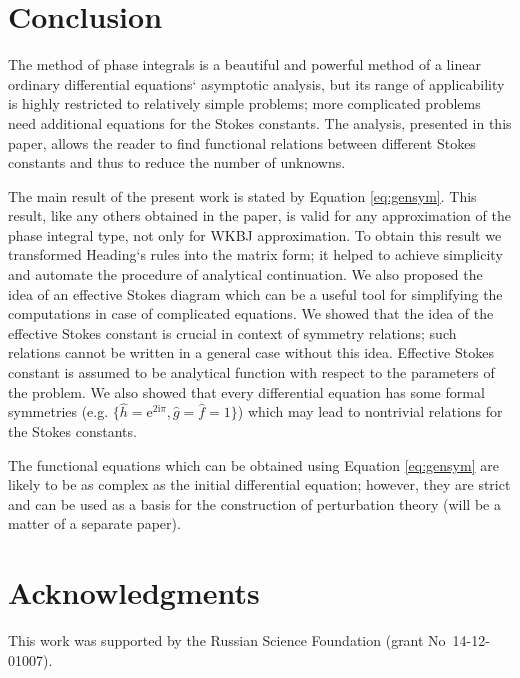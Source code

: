\documentclass[atmp]{ipart_v1}
\def\rme{\mathrm{e}}
\def\rmi{\mathrm{i}}
\def\f{\hat{f}}
\def\g{\hat{g}}
\def\h{\hat{h}}
\def\unity{1}
\newcommand\Eref[1]{Equation \ref{#1}}
\begin{document}
\section{Conclusion \label{sec:cnclsns}}

The method of phase integrals is a beautiful and powerful method of a linear ordinary 
differential equations` asymptotic analysis, but its range of applicability is highly 
restricted to relatively simple problems; more complicated problems need additional equations 
for the Stokes constants. The analysis, presented in this paper, allows the reader to find 
functional relations between different Stokes constants and thus to reduce the number of unknowns.

The main result of the present work is stated by \Eref{eq:gensym}. This result, 
like any others obtained in the paper, is valid for any approximation of the 
phase integral type, not only for WKBJ approximation. To obtain this result 
we transformed Heading`s rules \cite{heading,rwbook} into the matrix form; 
it helped to achieve simplicity and automate the procedure of analytical continuation. 
We also proposed the idea of an effective Stokes diagram which can be a useful tool 
for simplifying the computations in case of complicated equations. 
We showed that the idea of the effective Stokes constant is crucial in context of symmetry relations;
such relations cannot be written in a general case without this idea. 
Effective Stokes constant is assumed to be analytical function with respect to 
the parameters of the problem. 
We also showed that every differential 
equation has some formal symmetries (e.g. $\{\h=\rme^{2\rmi\pi},\g=\f=\unity\}$) which may lead
to nontrivial relations for the Stokes constants. 

The functional equations which can be obtained using \Eref{eq:gensym} are likely to be as 
complex as the initial differential equation; however, they are strict and can be used as 
a basis for the construction of perturbation theory (will be a matter of a separate paper).

\section*{Acknowledgments}
This work was supported by the Russian Science Foundation (grant No~14-12-01007). 
\end{document}

